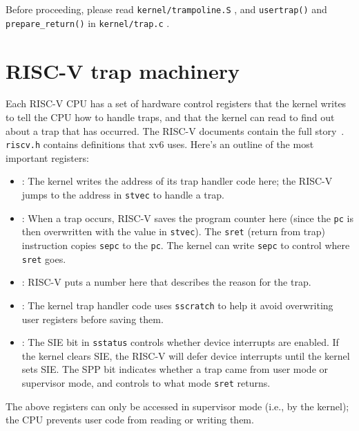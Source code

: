 Before proceeding, please read \lstinline{kernel/trampoline.S} ,
and {\tt usertrap()} and {\tt prepare\_return()} in \lstinline{kernel/trap.c} .

\section{RISC-V trap machinery}

Each RISC-V CPU has a set of hardware control registers that the kernel writes to
tell the CPU how to handle traps, and that the kernel can read
to find out about a trap that has occurred. The RISC-V documents
contain the full story~\cite{riscv:priv}. {\tt riscv.h}
 contains definitions that xv6 uses. Here's
an outline of the most important registers:

\begin{itemize}

\item {}: The kernel writes the address of its trap handler
  code here; the RISC-V jumps to the address in {\tt stvec} to handle a trap.

\item {}: When a trap occurs, RISC-V saves the program counter
  here (since the {\tt pc} is then overwritten with the
  value in {\tt stvec}). The
  {\tt sret} (return from trap) instruction copies {\tt sepc} to the
  {\tt pc}. The kernel can write {\tt sepc} to control where {\tt
    sret} goes.

\item {}: RISC-V puts a number here that describes
the reason for the trap.

\item {}: The kernel trap handler code uses {\tt sscratch}
  to help it avoid overwriting user registers before saving them.

\item {}: The SIE bit in {\tt sstatus}
  controls whether device interrupts
  are enabled. If the kernel clears SIE, the RISC-V will defer
  device interrupts until the kernel sets SIE. The SPP bit
  indicates whether a trap came from user mode or supervisor
  mode, and controls to what mode {\tt sret} returns.

\end{itemize}

The above registers can only be accessed in supervisor mode (i.e., by
the kernel); the CPU prevents user code from reading or writing them.


